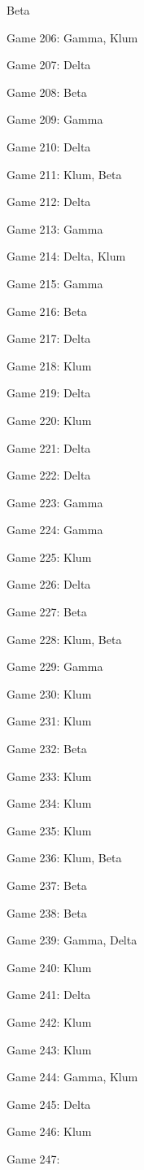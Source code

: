 \documentclass{article}
\begin{document}
\begin{multicols}{3}
\begin{compactitem}
Beta
\item Game 206:
Gamma, Klum
\item Game 207:
Delta
\item Game 208:
Beta
\item Game 209:
Gamma
\item Game 210:
Delta
\item Game 211:
Klum, Beta
\item Game 212:
Delta
\item Game 213:
Gamma
\item Game 214:
Delta, Klum
\item Game 215:
Gamma
\item Game 216:
Beta
\item Game 217:
Delta
\item Game 218:
Klum
\item Game 219:
Delta
\item Game 220:
Klum
\item Game 221:
Delta
\item Game 222:
Delta
\item Game 223:
Gamma
\item Game 224:
Gamma
\item Game 225:
Klum
\item Game 226:
Delta
\item Game 227:
Beta
\item Game 228:
Klum, Beta
\item Game 229:
Gamma
\item Game 230:
Klum
\item Game 231:
Klum
\item Game 232:
Beta
\item Game 233:
Klum
\item Game 234:
Klum
\item Game 235:
Klum
\item Game 236:
Klum, Beta
\item Game 237:
Beta
\item Game 238:
Beta
\item Game 239:
Gamma, Delta
\item Game 240:
Klum
\item Game 241:
Delta
\item Game 242:
Klum
\item Game 243:
Klum
\item Game 244:
Gamma, Klum
\item Game 245:
Delta
\item Game 246:
Klum
\item Game 247:

\end{compactitem}
\end{multicols}
\end{document}
